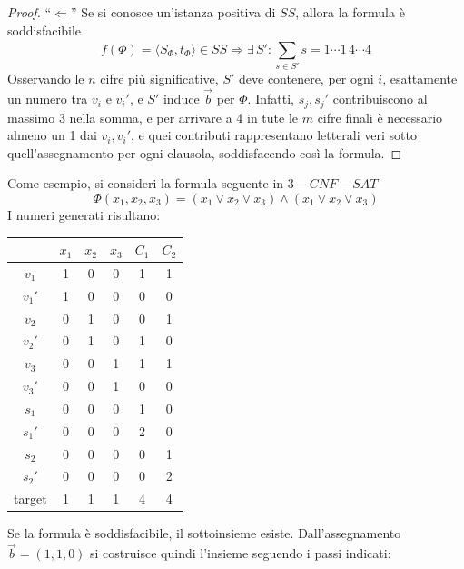 \begin{proof}
    ``$\Leftarrow$''
    Se si conosce un'istanza positiva di $SS$, allora la formula è soddisfacibile 
    \begin{equation*}
        f \left( \Phi \right) = 
        \langle
        S_{\Phi}, t_{\Phi}
        \rangle \in SS
        \Rightarrow
        \exists \, S' : \sum_{s \in S'}^{} s = 1 \cdots 1 \, 4 \cdots 4
    \end{equation*}
    Osservando le $n$ cifre più significative, $S'$ deve contenere, per ogni $i$, esattamente un numero tra $v_i$ e $v_i'$, e $S'$ induce $\vec{b}$ per $\Phi$.
    Infatti, $s_j, s_j'$ contribuiscono al massimo 3 nella somma, e per arrivare a 4 in tute le $m$ cifre finali è necessario almeno un 1 dai $v_i, v_i'$, e quei contributi rappresentano letterali veri sotto quell'assegnamento per ogni clausola, soddisfacendo così la formula.
\end{proof}
Come esempio, si consideri la formula seguente in $3-CNF-SAT$
\begin{equation*}
    \Phi \left( x_1, x_2, x_3 \right) = 
    \left( x_1 \vee \bar{x_2} \vee x_3 \right)
    \wedge
    \left( x_1 \vee x_2 \vee x_3 \right)
\end{equation*}
I numeri generati risultano:
\begin{center}
    \begin{tabular}[h]{c|ccc|cc}
               & $x_1$ & $x_2$ & $x_3$ & $C_1$ & $C_2$ \\
        \hline
        $v_1$  & 1 & 0 & 0 & 1 & 1 \\
        $v_1'$ & 1 & 0 & 0 & 0 & 0 \\
        $v_2$  & 0 & 1 & 0 & 0 & 1 \\
        $v_2'$ & 0 & 1 & 0 & 1 & 0 \\
        $v_3$  & 0 & 0 & 1 & 1 & 1 \\
        $v_3'$ & 0 & 0 & 1 & 0 & 0 \\
        \hline
        $s_1$  & 0 & 0 & 0 & 1 & 0 \\
        $s_1'$ & 0 & 0 & 0 & 2 & 0 \\
        $s_2$  & 0 & 0 & 0 & 0 & 1 \\
        $s_2'$ & 0 & 0 & 0 & 0 & 2 \\
        \hline
        target & 1 & 1 & 1 & 4 & 4 \\
    \end{tabular}
\end{center}
Se la formula è soddisfacibile, il sottoinsieme esiste. Dall'assegnamento $\vec{b} = (1,1,0)$ si costruisce quindi l'insieme seguendo i passi indicati:
